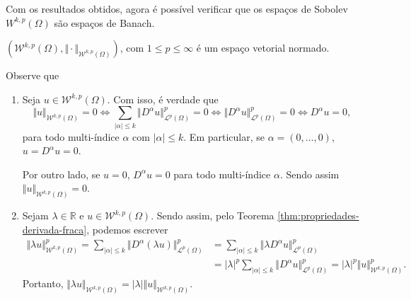 \documentclass[a4paper, 11pt]{book}
\theoremstyle{definition}
\newcommand{\bR}{\mathbb{R}}
\newcommand{\cL}{\mathcal{L}}
\newcommand{\cW}{\mathcal{W}}
\begin{document}
Com os resultados obtidos, agora é possível verificar que os espaços de Sobolev $W^{k,p}(\Omega)$ são espaços de Banach.

\begin{tbox}
    $(\cW^{k,p}(\Omega), \Vert \cdot \Vert_{\cW^{k,p}(\Omega)})$, com $1 \leqslant p \leqslant \infty$ é um espaço vetorial normado.
\end{tbox}
\begin{prf}
    Observe que
    \begin{enumerate}[leftmargin=*]
        \item Seja $u \in \cW^{k,p}(\Omega)$. Com isso, é verdade que
        \[
            \Vert u \Vert_{\cW^{k,p}(\Omega)} = 0 \iff \sum_{|\alpha| \leqslant k} \Vert D^\alpha u \Vert_{\cL^p(\Omega)}^p = 0 \iff \Vert D^\alpha u \Vert_{\cL^p(\Omega)}^p = 0 \iff D^\alpha u = 0,
        \]
        para todo multi-índice $\alpha$ com $|\alpha| \leqslant k$.
        Em particular, se $\alpha = (0,\dots,0)$, $u = D^\alpha u = 0$.

        Por outro lado, se $u = 0$, $D^\alpha u = 0$ para todo multi-índice $\alpha$. Sendo assim $\Vert u \Vert_{\cW^{k,p}(\Omega)} = 0$.

        \item Sejam $\lambda \in \bR$ e $u \in \cW^{k,p}(\Omega)$. Sendo assim, pelo Teorema \ref{thm:propriedades-derivada-fraca}, podemos escrever
        \[
            \begin{aligned}
                \Vert \lambda u \Vert_{\cW^{k,p}(\Omega)}^p = \sum_{|\alpha| \leqslant k} \Vert D^\alpha (\lambda u) \Vert_{\cL^p(\Omega)}^p &= \sum_{|\alpha| \leqslant k} \Vert \lambda D^\alpha u \Vert_{\cL^p(\Omega)}^p\\ 
                &= |\lambda|^p\sum_{|\alpha| \leqslant k} \Vert D^\alpha u \Vert_{\cL^p(\Omega)}^p = |\lambda|^p\Vert u \Vert_{\cW^{k,p}(\Omega)}^p.
            \end{aligned}
        \]
        Portanto, $\Vert \lambda u \Vert_{\cW^{k,p}(\Omega)} = |\lambda|\Vert u \Vert_{\cW^{k,p}(\Omega)}$.


\end{enumerate}
\end{prf}
\end{document}
